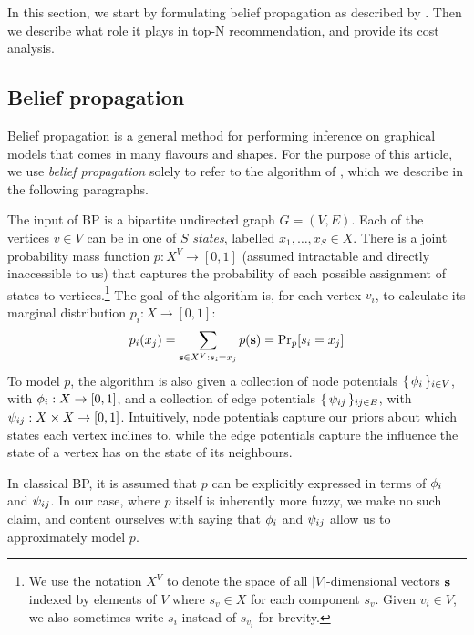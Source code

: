 \documentclass[letterpaper]{article}
\begin{document}
In this section, we start by formulating belief propagation as described by \citet{top-n-recommendation}. Then we describe what role it plays in top-N
recommendation, and provide its cost analysis.

\subsection{Belief propagation} \label{subsec:bp}

Belief propagation is a general method for performing inference on
graphical models that comes in many flavours and shapes. For the purpose of
this article, we use \emph{belief propagation} solely to refer to the algorithm
of \citet[Section 2.1]{top-n-recommendation}, which we describe in the
following paragraphs.

The input of BP is a bipartite undirected graph $G = (V, E)$. Each of the
vertices $v\in V$ can be in one of $S$ \emph{states}, labelled $x_1, \ldots,
x_S \in X$. There is a joint probability mass function $p: X^V \to [0, 1]$
(assumed intractable and directly inaccessible to us) that captures the probability of
each possible assignment of states to vertices.\footnote{We use the notation
$X^V$ to denote the space of all $|V|$-dimensional vectors $\ves$ indexed by
elements of $V$ where $s_v\in X$ for each component $s_v$. Given $v_i \in V$, we
also sometimes write $s_i$ instead of $s_{v_i}$ for brevity.} The goal of the
algorithm is, for each vertex $v_i$, to calculate its marginal distribution
$p_i: X \to [0, 1]$:
%
$$p_i(x_j) = \sum_{\ves \in X^V: s_i = x_j} p(\ves) = \Pr_p[s_i = x_j]$$
%
To model $p$, the algorithm is also given a collection of node potentials
$\{\,\phi_i\,\}_{i \in V}$, with $\phi_i: X \to [0, 1]$, and a collection of edge
potentials $\{\,\psi_{ij}\,\}_{ij \in E}$, with $\psi_{ij}: X\times X \to [0, 1]$.
Intuitively, node potentials capture our priors about which states each vertex
inclines to, while the edge potentials capture the influence the state of a
vertex has on the state of its neighbours.

In classical BP, it is assumed that $p$ can be explicitly expressed in terms of
$\phi_i$ and $\psi_{ij}$. In our case, where $p$ itself is inherently more
fuzzy, we make no such claim, and content ourselves with saying that $\phi_i$
and $\psi_{ij}$ allow us to approximately model $p$.
\end{document}
